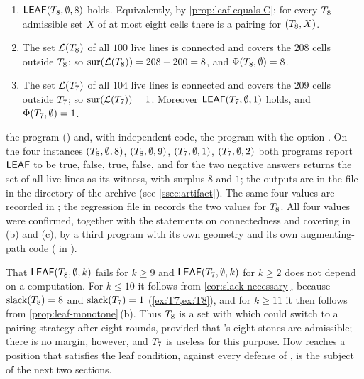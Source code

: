 \begin{fact}\label{fact:T8-leaf}
\begin{enumerate}[label=\textup{(\alph*)}]
\item $\mathsf{LEAF}(T_8,\emptyset,8)$ holds. Equivalently, by \cref{prop:leaf-equals-C}: for every
      $T_8$-admissible set $X$ of at most eight cells there is a pairing for $(T_8,X)$.
\item The set $\mathcal{L}(T_8)$ of all $100$ live lines is connected and covers the $208$ cells outside
      $T_8$; so $\operatorname{sur}(\mathcal{L}(T_8))=208-200=8$, and $\Phi(T_8,\emptyset)=8$.
\item The set $\mathcal{L}(T_7)$ of all $104$ live lines is connected and covers the $209$ cells outside
      $T_7$; so $\operatorname{sur}(\mathcal{L}(T_7))=1$. Moreover $\mathsf{LEAF}(T_7,\emptyset,1)$ holds, and
      $\Phi(T_7,\emptyset)=1$.
\end{enumerate}

\established the program  () and, with independent code, the
program  with the option . On the four instances
$(T_8,\emptyset,8)$, $(T_8,\emptyset,9)$, $(T_7,\emptyset,1)$, $(T_7,\emptyset,2)$ both
programs report $\mathsf{LEAF}$ to be true, false, true, false, and
for the two negative answers  returns the set of all live lines as its witness, with
surplus $8$ and $1$; the outputs are in the file  in the directory
 of the archive (see \cref{ssec:artifact}). The same four values are recorded in
\mbox{}; the regression file  in 
records the two values for $T_8$. All four values were confirmed,
together with the statements on connectedness and covering in (b) and (c), by a third program with its
own geometry and its own augmenting-path code ( in ).
\end{fact}

That $\mathsf{LEAF}(T_8,\emptyset,k)$ fails for $k\ge 9$ and $\mathsf{LEAF}(T_7,\emptyset,k)$ for $k\ge 2$ does not
depend on a computation. For $k\le 10$ it follows from \cref{cor:slack-necessary}, because
$\operatorname{slack}(T_8)=8$ and $\operatorname{slack}(T_7)=1$ (\cref{ex:T7,ex:T8}), and for $k\ge 11$ it then follows from
\cref{prop:leaf-monotone}\,(b). Thus $T_8$ is a set with which \Breaker{} could switch to a
pairing strategy after eight rounds, provided that \Maker's eight stones are admissible; there is no
margin, however, and $T_7$ is useless for this purpose. How \Breaker{} reaches a position that satisfies
the leaf condition, against every defense of \Maker, is the subject of the next two sections.

